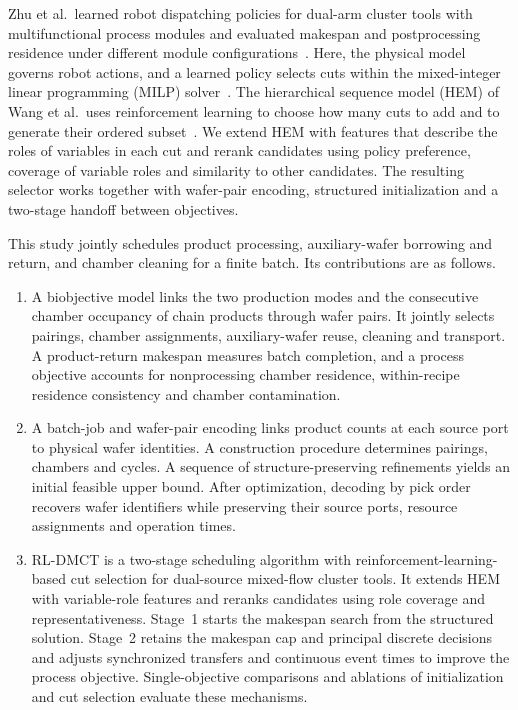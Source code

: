 Zhu et al.\ learned robot dispatching policies for dual-arm cluster tools with multifunctional process modules and evaluated makespan and postprocessing residence under different module configurations~\citep{zhu2026multifunction}. Here, the physical model governs robot actions, and a learned policy selects cuts within the mixed-integer linear programming (MILP) solver~\citep{tang2020cut,huang2022cutranking,paulus2022looking}. The hierarchical sequence model (HEM) of Wang et al.\ uses reinforcement learning to choose how many cuts to add and to generate their ordered subset~\citep{wang2023hem,wang2024hem}. We extend HEM with features that describe the roles of variables in each cut and rerank candidates using policy preference, coverage of variable roles and similarity to other candidates. The resulting selector works together with wafer-pair encoding, structured initialization and a two-stage handoff between objectives.

This study jointly schedules product processing, auxiliary-wafer borrowing and return, and chamber cleaning for a finite batch. Its contributions are as follows.
\begin{enumerate}[leftmargin=*]
\item A biobjective model links the two production modes and the consecutive chamber occupancy of chain products through wafer pairs. It jointly selects pairings, chamber assignments, auxiliary-wafer reuse, cleaning and transport. A product-return makespan measures batch completion, and a process objective accounts for nonprocessing chamber residence, within-recipe residence consistency and chamber contamination.
\item A batch-job and wafer-pair encoding links product counts at each source port to physical wafer identities. A construction procedure determines pairings, chambers and cycles. A sequence of structure-preserving refinements yields an initial feasible upper bound. After optimization, decoding by pick order recovers wafer identifiers while preserving their source ports, resource assignments and operation times.
\item RL-DMCT is a two-stage scheduling algorithm with reinforcement-learning-based cut selection for dual-source mixed-flow cluster tools. It extends HEM with variable-role features and reranks candidates using role coverage and representativeness. Stage~1 starts the makespan search from the structured solution. Stage~2 retains the makespan cap and principal discrete decisions and adjusts synchronized transfers and continuous event times to improve the process objective. Single-objective comparisons and ablations of initialization and cut selection evaluate these mechanisms.
\end{enumerate}


